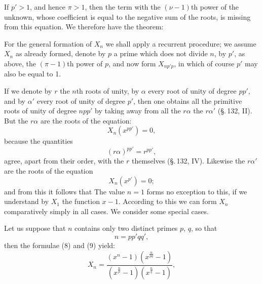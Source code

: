 If $p' > 1$, and hence $\pi > 1$, then the term with the
$(\nu-1)$th power of the unknown, whose coefficient is equal to the negative sum of the roots, is missing from this equation. We therefore
have the theorem:


For the general formation of $X_n$ we shall apply a recurrent
procedure; we assume $X_n$ as already formed,
denote by $p$ a prime which does not divide $n$, by $p'$,
as above, the $(\pi-1)$th power of $p$, and now form $X_{np'p}$,
in which of course $p'$ may also be equal to 1.

If we denote by $r$ the  $n$th roots of unity,
by $\alpha$ every root of unity of degree $pp'$, and by $\alpha'$ every root of unity of degree $p'$, then one obtains all the primitive roots of unity of degree $npp'$ by taking away from all the
$r\alpha$ the $r\alpha'$ (\S.\,132, II). But the $r\alpha$ are
the roots of the equation:
\[
X_n(x^{pp'}) = 0,
\]
because the quantities
\[
(r\alpha)^{pp'} = r^{pp'},
\]
agree, apart from their order, with the $r$ themselves
(\S.\,132, IV). Likewise the $r\alpha'$ are the roots of the equation
\[
X_n(x^{p'}) = 0;
\]
and from this it follows that
The value $n=1$ forms no exception to this,
if we understand by $X_1$ the function $x-1$. According to this
we can form $X_n$ comparatively simply in all cases.
We consider some special cases.

Let us suppose that $n$ contains only two distinct primes $p$, $q$, so that
\[
n = pp'qq',
\]
then the formulae (8) and (9) yield:
\[
X_n = \frac{(x^n-1)\left(x^{\frac{n}{pq}}-1\right)}{\left(x^{\frac{n}{p}}-1\right)\left(x^{\frac{n}{q}}-1\right)},
\]
